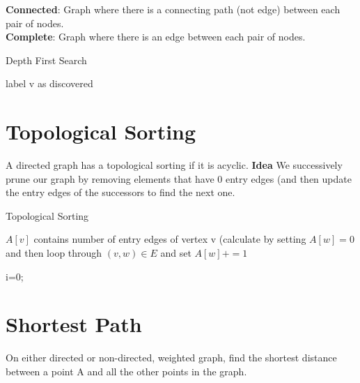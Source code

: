 \documentclass[10pt,landscape,a4paper, table]{extarticle}
\begin{document}
\begin{multicols*}{3}
\textbf{Connected}: Graph where there is a connecting path (not edge) between each pair of nodes.\\
\textbf{Complete}: Graph where there is an edge between each pair of nodes. 



{\scriptsize
\begin{algorithm}[H]
    \caption{Depth First Search}
    \label{FWAlgorithm}
    \SetAlgoLined
    label v as discovered\\

\end{algorithm}}

\section{Topological Sorting} {
A directed graph has a topological sorting if it is acyclic. \textbf{Idea} We successively prune our graph by removing elements that have 0 entry edges (and then update the entry edges of the successors to find the next one.

{\scriptsize
\begin{algorithm}[H]
    \caption{Topological Sorting}
    \label{FWAlgorithm}
    \SetAlgoLined

$A[v]$ contains number of entry edges of vertex v (calculate by setting $A[w] = 0$ and then loop through $(v, w) \in E$ and set $A[w] += 1$ 

i=0;

\end{algorithm}
}

}

\section{Shortest Path}
On either directed or non-directed, weighted graph, find the shortest distance between a point A and all the other points in the graph.


\end{multicols*}
\end{document}
